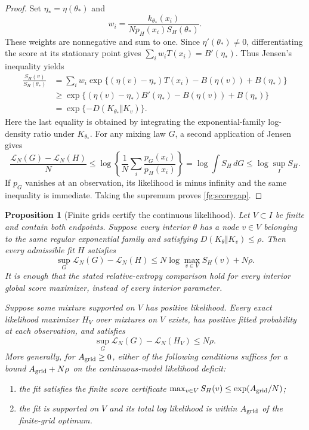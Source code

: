 \documentclass[11pt,a4paper]{article}
\newtheorem{proposition}[theorem]{Proposition}
\theoremstyle{definition}
\theoremstyle{remark}
\numberwithin{equation}{section}
\begin{document}
\begin{proof}
Set $\eta_* =\eta(\theta_*)$ and
\[
 w_i=\frac{k_{\theta_*}(x_i)}{N p_H(x_i)S_H(\theta_*)}.
\]
These weights are nonnegative and sum to one. Since
$\eta'(\theta_*)\ne0$, differentiating the score at its stationary
point gives
$\sum_iw_iT(x_i)=B'(\eta_*)$. Thus Jensen's inequality yields
\begin{align*}
 \frac{S_H(v)}{S_H(\theta_*)}
 &=\sum_iw_i\exp\{(\eta(v)-\eta_*)T(x_i)
                           -B(\eta(v))+B(\eta_*)\}\\
 &\ge\exp\{(\eta(v)-\eta_*)B'(\eta_*)
                           -B(\eta(v))+B(\eta_*)\}\\
 &=\exp\{-D(K_{\theta_*}\Vert K_v)\}.
\end{align*}
Here the last equality is obtained by integrating the exponential-family
log-density ratio under $K_{\theta_*}$.
For any mixing law $G$, a second application of Jensen gives
\[
 \frac{\mathcal L_N(G)-\mathcal L_N(H)}N
 \le\log\left\{\frac1N\sum_i\frac{p_G(x_i)}{p_H(x_i)}\right\}
 =\log\int S_H\,dG\le\log\sup_I S_H.
\]
If $p_G$ vanishes at an observation, its likelihood is minus infinity
and the same inequality is immediate. Taking the supremum proves
\eqref{fg:scoregap}.
\end{proof}

\begin{proposition}[Finite grids certify the continuous likelihood]
\label{fg:gridprinciple}
Let $V\subset I$ be finite and contain both endpoints. Suppose every
interior $\theta$ has a node $v\in V$ belonging to the same regular
exponential family and satisfying
$D(K_\theta\Vert K_v)\le\rho$. Then every admissible fit $H$ satisfies
\begin{equation}\label{fg:globalcertificate}
 \sup_G\mathcal L_N(G)-\mathcal L_N(H)
       \le N\log\max_{v\in V}S_H(v)+N\rho.
\end{equation}
It is enough that the stated relative-entropy comparison hold for every
interior global score maximizer, instead of every interior parameter.

Suppose some mixture supported on $V$ has positive likelihood. Every
exact likelihood maximizer $H_V$ over mixtures on $V$ exists, has
positive fitted probability at each observation, and satisfies
\begin{equation}\label{fg:exactgrid}
                 \sup_G\mathcal L_N(G)-\mathcal L_N(H_V)\le N\rho.
\end{equation}
More generally, for $A_{\rm grid}\ge0$, either of the following conditions suffices for a bound
$A_{\rm grid}+N\rho$ on the continuous-model likelihood deficit:
\begin{enumerate}
\item the fit satisfies the finite score certificate
$\max_{v\in V}S_H(v)\le\exp(A_{\rm grid}/N)$;
\item the fit is supported on $V$ and its total log likelihood is
within $A_{\rm grid}$ of the finite-grid optimum.
\end{enumerate}
\end{proposition}
\end{document}
